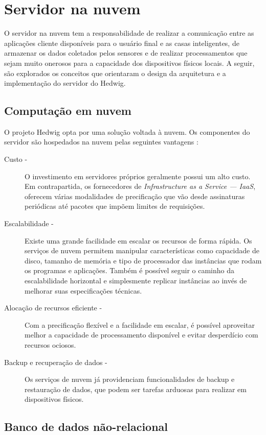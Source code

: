 \section{Servidor na nuvem}

O servidor na nuvem tem a responsabilidade de realizar a comunicação entre as aplicações cliente disponíveis para o usuário final e as casas inteligentes, de armazenar os dados coletados pelos sensores e de realizar processamentos que sejam muito onerosos para a capacidade dos dispositivos físicos locais. A seguir, são explorados os conceitos que orientaram o design da arquitetura e a implementação do servidor do Hedwig.

\subsection{Computação em nuvem}

O projeto Hedwig opta por uma solução voltada à nuvem. Os componentes do servidor são hospedados na nuvem pelas seguintes vantagens \cite{viswanathan}:

\begin{description}
\item[Custo -]O investimento em servidores próprios geralmente possui um alto custo. Em contrapartida, os fornecedores de \emph{Infrastructure as a Service --- IaaS}, oferecem várias modalidades de precificação que vão desde assinaturas periódicas até pacotes que impõem limites de requisições.
\item[Escalabilidade -]Existe uma grande facilidade em escalar os recursos de forma rápida. Os serviços de nuvem permitem manipular características como capacidade de disco, tamanho de memória e tipo de processador das instâncias que rodam os programas e aplicações. Também é possível seguir o caminho da escalabilidade horizontal e simplesmente replicar instâncias ao invés de melhorar suas especificações técnicas.
\item[Alocação de recursos eficiente -]Com a precificação flexível e a facilidade em escalar, é possível aproveitar melhor a capacidade de processamento disponível e evitar desperdício com recursos ociosos.
\item[Backup e recuperação de dados -]Os serviços de nuvem já providenciam funcionalidades de backup e restauração de dados, que podem ser tarefas arduosas para realizar em dispositivos físicos.
\end{description}

\subsection{Banco de dados não-relacional}

